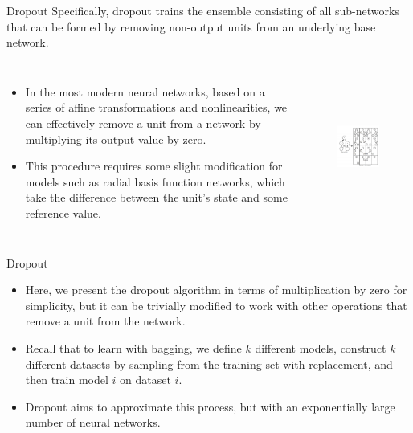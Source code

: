 \documentclass[10pt]{beamer}
\begin{document}
	\begin{frame}{Dropout}
		Specifically, dropout trains the ensemble consisting of all sub-networks that can be formed by removing non-output units from an underlying base network.
		\begin{columns}
			\begin{itemize}
				\item In the most modern neural networks, based on a series of affine transformations and nonlinearities, we can effectively remove a unit from a network by multiplying its output value by zero. 
				\item This procedure requires some slight modification for models such as radial basis function networks, which take the difference between the unit's state and some reference value.
			\end{itemize}
			\begin{figure}
				\includegraphics[height=13em]{figures/dropout.png}
			\end{figure}
		\end{columns}
	\end{frame}
	
	\begin{frame}{Dropout}
		\begin{itemize}
			\item Here, we present the dropout algorithm in terms of multiplication by zero for simplicity, but it can be trivially modified to work with other operations that remove a unit from the network.
			\pause
			\item Recall that to learn with bagging, we define $k$ different models, construct $k$ different datasets by sampling from the training set with replacement, and then train model $i$ on dataset $i$.
			\pause
			\item Dropout aims to approximate this process, but with an exponentially large number of neural networks.
		\end{itemize}
	\end{frame}
	
\end{document}
